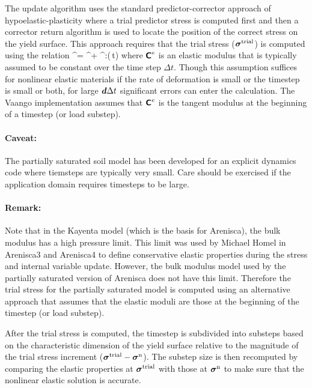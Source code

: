 The update algorithm uses the standard predictor-corrector approach of hypoelastic-plasticity
where a trial predictor stress is computed first and then a corrector return algorithm is used to
locate the position of the correct stress on the yield surface. This approach requires that
the trial stress ($\boldsymbol{\sigma}^{\text{trial}}$) is computed using the relation
\Beq
  \Bsig^\Trial = \Bsig^\Tn + \SfC^\Te:(\Bd\,\Delta t)
\Eeq
where $\boldsymbol{\mathsf{C}}^{\text{e}}$ is an elastic modulus that is typically assumed to be constant over the time 
step $\Delta t$.  Though this assumption suffices for nonlinear elastic materials if the rate of 
deformation is small or the timestep is small or both, for large $\boldsymbol{d} \Delta t$ significant errors
can enter the calculation.  {\Ochre The Vaango implementation assumes that $\boldsymbol{\mathsf{C}}^e$ is the tangent 
modulus at the beginning of a timestep (or load substep).}

\paragraph{Caveat:}
The partially saturated soil model has been developed for an explicit dynamics code where 
tiemsteps are typically very small.  Care should be exercised if the application domain
requires timesteps to be large.

\paragraph{Remark:}
{\footnotesize
Note that in the Kayenta model (which is the basis for Arenisca), the bulk modulus has a high pressure 
limit.  This limit was used by Michael Homel in Arenisca3 and Arenisca4 to define conservative elastic
properties during the stress and internal variable update.  However, the bulk modulus model used 
by the partially saturated version of Arenisca does not have this limit.  Therefore the trial stress
for the partially saturated model is computed using an alternative approach that assumes that
the elastic moduli are those at the beginning of the timestep (or load substep).
}

After the trial stress is computed, the timestep is subdivided into substeps based on the 
characteristic dimension of the yield surface relative to the magnitude of the trial stress 
increment ($\boldsymbol{\sigma}^{\text{trial}} - \boldsymbol{\sigma}^{\text{n}}$).  The substep size is then recomputed by comparing the
elastic properties at $\boldsymbol{\sigma}^{\text{trial}}$ with those at $\boldsymbol{\sigma}^{\text{n}}$ to make sure that the nonlinear
elastic solution is accurate.
 
